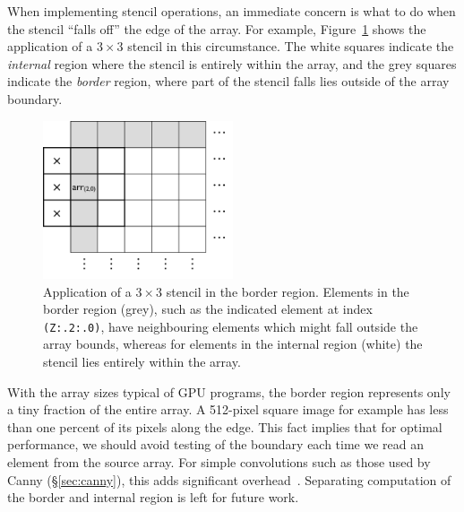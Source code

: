When implementing stencil operations, an immediate concern is what to do when
the stencil ``falls off'' the edge of the array. For example,
Figure~\ref{fig:stencil3x3} shows the application of a $3\times3$ stencil
in this circumstance. The white squares indicate the \emph{internal} region
where the stencil is entirely within the array, and the grey squares indicate
the \emph{border} region, where part of the stencil falls lies outside of the
array boundary.

\begin{figure}[htbp]
    \begin{center}
        \includegraphics[width=0.5\textwidth]{images/sec-6/stencil3x3}
    \end{center}
    \caption[Application of a $3\times3$ stencil in the border region]
        {Application of a $3\times3$ stencil in the border region. Elements in
        the border region (grey), such as the indicated element at index
        \lstinline[style=inline,basicstyle=\sourcecodepro\footnotesize]{(Z:.2:.0)},
        have neighbouring elements which might fall outside the array bounds,
        whereas for elements in the internal region (white) the stencil lies
        entirely within the array.}
    \label{fig:stencil3x3}
\end{figure}

With the array sizes typical of GPU programs, the border region represents only
a tiny fraction of the entire array. A 512-pixel square image for example has
less than one percent of its pixels along the edge. This fact implies that for
optimal performance, we should avoid testing of the boundary each time we read
an element from the source array. For simple convolutions such as those used by
Canny (\S\ref{sec:canny}), this adds significant
overhead~\cite{Lippmeier:2011cd}. Separating computation of the border and
internal region is left for future work.



